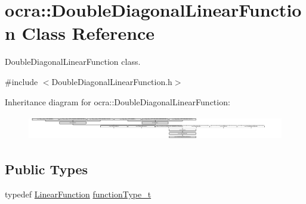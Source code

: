 \hypertarget{classocra_1_1DoubleDiagonalLinearFunction}{}\section{ocra\+:\+:Double\+Diagonal\+Linear\+Function Class Reference}
\label{classocra_1_1DoubleDiagonalLinearFunction}


Double\+Diagonal\+Linear\+Function class.  




{\ttfamily \#include $<$Double\+Diagonal\+Linear\+Function.\+h$>$}

Inheritance diagram for ocra\+:\+:Double\+Diagonal\+Linear\+Function\+:\begin{figure}[H]
\begin{center}
\leavevmode
\includegraphics[height=1.082126cm]{d4/d5c/classocra_1_1DoubleDiagonalLinearFunction}
\end{center}
\end{figure}
\subsection*{Public Types}
\begin{DoxyCompactItemize}
\item 
typedef \hyperlink{classocra_1_1LinearFunction}{Linear\+Function} \hyperlink{classocra_1_1DoubleDiagonalLinearFunction_a69a17b7aa1e34b31ac1cc18cca3a3b38}{function\+Type\+\_\+t}
\end{DoxyCompactItemize}
